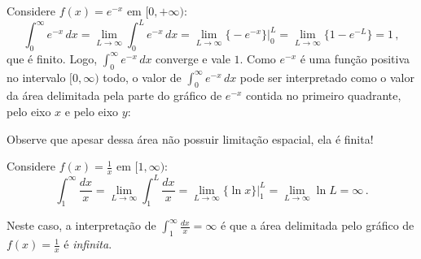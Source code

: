 \begin{ex}
Considere $f(x)=e^{-x}$ em $[0,+\infty)$:
$$
\int_0^\infty e^{-x}\,dx=\lim_{L\to \infty}\int_0^L e^{-x}\,dx=
\lim_{L\to \infty} \bigl\{-e^{-x}\bigr\}\big|_0^{L}=
\lim_{L\to \infty} \bigl\{1-e^{-L}\bigr\}=1\,,
$$ 
que é finito. Logo, $\int_0^\infty e^{-x}\,dx$ converge e vale $1$.
Como $e^{-x}$ é uma função positiva no intervalo $[0,\infty)$ todo, o valor de
$\int_0^\infty e^{-x}\,dx$ pode
ser interpretado como
o valor da área delimitada pela parte do gráfico de $e^{-x}$ contida no
primeiro quadrante,
pelo eixo $x$ e pelo eixo $y$:
\begin{center}
\begin{bmlimage}\end{bmlimage}
\end{center}
Observe que
apesar
dessa área não possuir
limitação espacial, ela é finita!
\end{ex}

\begin{ex}\label{Ex:unsurxdiverge}
Considere $f(x)=\frac{1}{x}$ em $[1,\infty)$:
$$
\int_1^\infty \frac{dx}{x}=\lim_{L\to \infty}\int_1^L \frac{dx}{x}=
\lim_{L\to \infty} \bigl\{\ln x\bigr\}\big|_1^{L}=
\lim_{L\to \infty} \ln L=\infty\,.
$$ 
\begin{center}
\begin{bmlimage}\end{bmlimage}
\end{center}
Neste caso, a interpretação de $\int_1^\infty \frac{dx}{x}=\infty$ é que a área
delimitada pelo gráfico de $f(x)=\tfrac1x$ é \emph{infinita}.
\end{ex}

